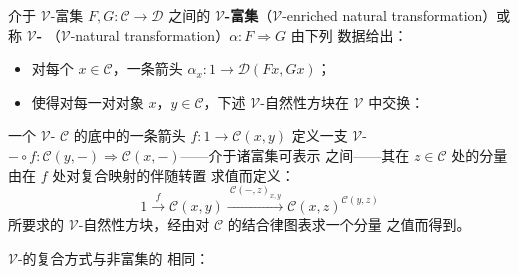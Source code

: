 \begin{definition}\label{def:vnatural-transformation}
介于 $\mathcal{V}$-富集\trFunctor{} $F,G\colon\mathcal{C}\to\mathcal{D}$ 之间的
$\mathcal{V}$\textbf{-富集\trNaturalTransformation}（$\mathcal{V}$-enriched
natural transformation）或称 $\mathcal{V}$\textbf{-\trNaturalTransformation}
（$\mathcal{V}$-natural transformation）$\alpha\colon F\Rightarrow G$ 由下列
数据给出：
\begin{itemize}
\item 对每个 $x\in\mathcal{C}$，一条箭头 $\alpha_{x}\colon 1\to\mathcal{D}(Fx,Gx)$；
\item 使得对每一对对象 $x$，$y\in\mathcal{C}$，下述 $\mathcal{V}$-自然性方块在
  $\mathcal{V}$ 中交换：
\begin{rveq}\label{eq:vnaturality-square}
\end{rveq}
\end{itemize}
\end{definition}

\begin{example}\label{exa:post-composition-vnatural-transformation}
一个 $\mathcal{V}$-\trCategory{} $\mathcal{C}$ 的底\trCategory{}中的一条箭头
$f\colon 1\to\mathcal{C}(x,y)$ 定义一支 $\mathcal{V}$-\trNaturalTransformation
$-\circ f\colon\mathcal{C}(y,-)\Rightarrow\mathcal{C}(x,-)$——介于诸富集可表示%
\trFunctor{}之间——其在 $z\in\mathcal{C}$ 处的分量由在 $f$ 处对复合映射的伴随转置
求值而定义：
\[ 1\xrightarrow{\ f\ }\mathcal{C}(x,y)
   \xrightarrow{\ \mathcal{C}(-,z)_{x,y}\ }\mathcal{C}(x,z)^{\mathcal{C}(y,z)} \]
所要求的 $\mathcal{V}$-自然性方块，经由对 $\mathcal{C}$ 的结合律图表求一个分量
之值而得到。
\end{example}

$\mathcal{V}$-\trNaturalTransformation{}的复合方式与非富集的%
\trNaturalTransformation{}相同：

